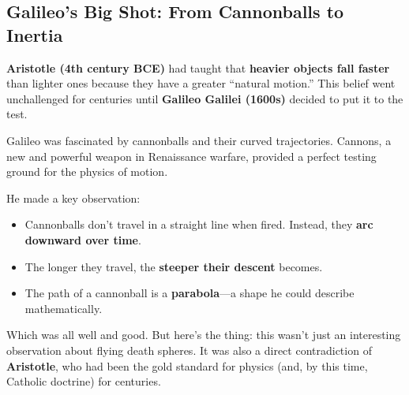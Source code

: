 \subsection{Galileo’s Big Shot: From Cannonballs to Inertia}

\textbf{Aristotle (4th century BCE)} had taught that \textbf{heavier objects fall faster} than lighter ones because they have a greater “natural motion.” This belief went unchallenged for centuries until \textbf{Galileo Galilei (1600s)} decided to put it to the test.

Galileo was fascinated by cannonballs and their curved trajectories. Cannons, a new and powerful weapon in Renaissance warfare, provided a perfect testing ground for the physics of motion.

He made a key observation:

\begin{itemize}
    \item Cannonballs don’t travel in a straight line when fired. Instead, they \textbf{arc downward over time}.
    \item The longer they travel, the \textbf{steeper their descent} becomes.
    \item The path of a cannonball is a \textbf{parabola}—a shape he could describe mathematically.
\end{itemize}

\begin{center}
\end{center}


Which was all well and good. But here’s the thing: this wasn’t just an interesting observation about flying death spheres. It was also a direct contradiction of \textbf{Aristotle}, who had been the gold standard for physics (and, by this time, Catholic doctrine) for centuries. 

